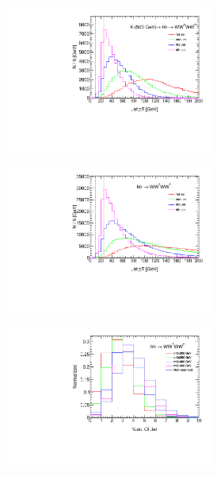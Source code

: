 \begin{figure}
\begin{subfigure}[b]{0.45\textwidth}
 \label{fig:SigTopo:pt_jet_mH400}
\end{subfigure}
\begin{subfigure}[b]{0.45\textwidth}
 \includegraphics[width=0.75\textwidth, angle =-90]{fig/SigTopo/pt_jet_mH500.pdf}\caption{}
 \label{fig:SigTopo:pt_jet_mH500}
\end{subfigure}
\begin{subfigure}[b]{0.45\textwidth}
 \includegraphics[width=0.75\textwidth, angle =-90]{fig/SigTopo/pt_jet_nonres.pdf}\caption{}
 \label{fig:SigTopo:pt_jet_nonres}
\end{subfigure}
\begin{subfigure}[b]{0.45\textwidth}
 \includegraphics[width=0.75\textwidth, angle =-90]{fig/SigTopo/numOfjet_sig.pdf}\caption{}

\end{subfigure}
\end{figure}
